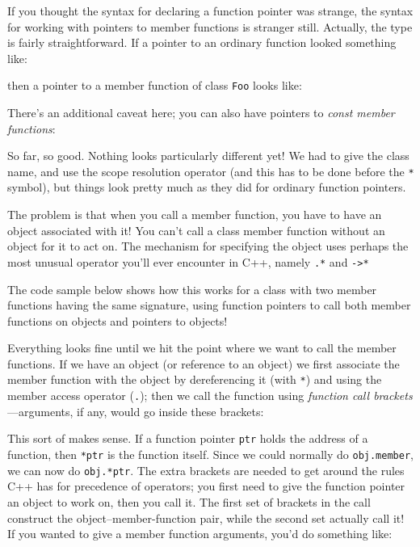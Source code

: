 \documentclass[a4paper]{scrartcl}
\begin{document}
If you thought the syntax for declaring a function pointer was strange, the syntax for working with pointers to member functions is stranger still. Actually, the type is fairly straightforward. If a pointer to an ordinary function looked something like:



then a pointer to a member function of class \verb|Foo| looks like:



There's an additional caveat here; you can also have pointers to \emph{const member functions}:



So far, so good. Nothing looks particularly different yet! We had to give the class name, and use the scope resolution operator (and this has to be done before the \verb|*| symbol), but things look pretty much as they did for ordinary function pointers.

The problem is that when you call a member function, you have to have an object associated with it! You can't call a class member function without an object for it to act on. The mechanism for specifying the object uses perhaps the most unusual operator you'll ever encounter in C++, namely \verb|.*| and \verb|->*|

The code sample below shows how this works for a class with two member functions having the same signature, using function pointers to call both member functions on objects and pointers to objects!



Everything looks fine until we hit the point where we want to call the member functions. If we have an object (or reference to an object) we first associate the member function with the object by dereferencing it (with \verb|*|) and using the member access operator (\verb|.|); then we call the function using \emph{function call brackets}---arguments, if any, would go inside these brackets:



This sort of makes sense. If a function pointer \texttt{ptr} holds the address of a function, then \verb|*ptr| is the function itself. Since we could normally do \verb|obj.member|, we can now do \verb|obj.*ptr|. The extra brackets are needed to get around the rules C++ has for precedence of operators; you first need to give the function pointer an object to work on, then you call it. The first set of brackets in the call construct the object--member-function pair, while the second set actually call it! If you wanted to give a member function arguments, you'd do something like:
\end{document}

